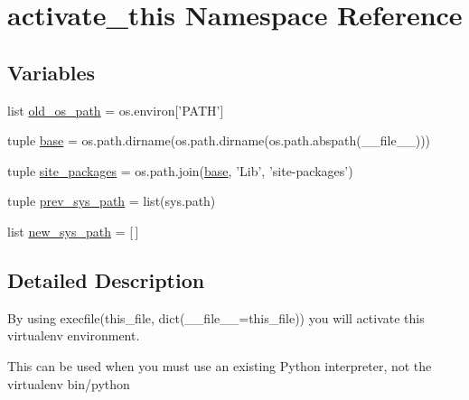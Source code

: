 \hypertarget{namespaceactivate__this}{\section{activate\-\_\-this Namespace Reference}
\label{namespaceactivate__this}
}
\subsection*{Variables}
\begin{DoxyCompactItemize}
\item 
list \hyperlink{namespaceactivate__this_a873e4b6c60168d32296fd4d7c71729a8}{old\-\_\-os\-\_\-path} = os.\-environ\mbox{[}'P\-A\-T\-H'\mbox{]}
\item 
tuple \hyperlink{namespaceactivate__this_a1991b325073a471cc79e0618269a6a99}{base} = os.\-path.\-dirname(os.\-path.\-dirname(os.\-path.\-abspath(\-\_\-\-\_\-file\-\_\-\-\_\-)))
\item 
tuple \hyperlink{namespaceactivate__this_a108e827412e25bb10aa807f71ff0fda1}{site\-\_\-packages} = os.\-path.\-join(\hyperlink{namespaceactivate__this_a1991b325073a471cc79e0618269a6a99}{base}, 'Lib', 'site-\/packages')
\item 
tuple \hyperlink{namespaceactivate__this_a7cb3478e983ceabe76c7445e9dec7891}{prev\-\_\-sys\-\_\-path} = list(sys.\-path)
\item 
list \hyperlink{namespaceactivate__this_a0da23a91013e49768e9347fcdd781d3d}{new\-\_\-sys\-\_\-path} = \mbox{[}$\,$\mbox{]}
\end{DoxyCompactItemize}


\subsection{Detailed Description}
\begin{DoxyVerb}By using execfile(this_file, dict(__file__=this_file)) you will
activate this virtualenv environment.

This can be used when you must use an existing Python interpreter, not
the virtualenv bin/python
\end{DoxyVerb}
 

